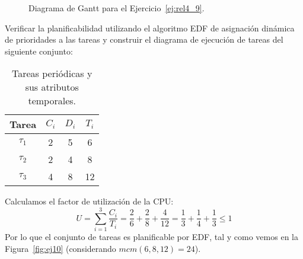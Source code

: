 \begin{ejercicio}
\begin{figure}[H]
        \caption{Diagrama de Gantt para el Ejercicio~\ref{ej:rel4_9}\@.}
        \label{fig:ej9}
    \end{figure}
\end{ejercicio}

\begin{ejercicio}\label{ej:rel4_10}
    Verificar la planificabilidad utilizando el algoritmo EDF de asignación dinámica de prioridades a las tareas y construir el diagrama de ejecución de tareas del siguiente conjunto:
    \begin{table}[H]
    \centering
    \begin{tabular}{|c|c|c|c|}
        \hline
        Tarea & $C_i$ & $D_i$ & $T_i$ \\
        \hline
        $\tau_1$ & 2 & 5 & 6 \\
        \hline
        $\tau_2$ & 2 & 4 & 8 \\
        \hline
        $\tau_3$ & 4 & 8 & 12 \\
        \hline
    \end{tabular}
    \caption{Tareas periódicas y sus atributos temporales.}
    \label{tab:4_10}
    \end{table}

    Calculamos el factor de utilización de la CPU\@:
    \begin{equation*}
        U = \sum_{i=1}^{3} \dfrac{C_i}{T_i} = \dfrac{2}{6} + \dfrac{2}{8} + \dfrac{4}{12} = \dfrac{1}{3} + \dfrac{1}{4} + \dfrac{1}{3} \leq 1
    \end{equation*}
    Por lo que el conjunto de tareas es planificable por EDF, tal y como vemos en la Figura~\ref{fig:ej10} (considerando $mcm(6,8,12)=24$).
    \begin{figure}[H]
        \centering
\end{figure}
\end{ejercicio}
